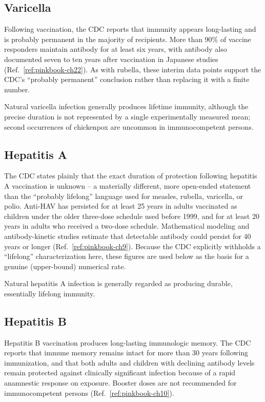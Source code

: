 \documentclass[11pt]{article}
\begin{document}
\subsection{Varicella}

Following vaccination, the CDC reports that immunity appears long-lasting
and is probably permanent in the majority of recipients. More than 90\% of
vaccine responders maintain antibody for at least six years, with antibody
also documented seven to ten years after vaccination in Japanese studies
(Ref.~\ref{ref:pinkbook-ch22}). As with rubella, these interim data points
support the CDC's ``probably permanent'' conclusion rather than replacing it
with a finite number.

Natural varicella infection generally produces lifetime immunity, although
the precise duration is not represented by a single experimentally measured
mean; second occurrences of chickenpox are uncommon in immunocompetent
persons.

\subsection{Hepatitis A}

The CDC states plainly that the exact duration of protection following
hepatitis A vaccination is unknown -- a materially different, more
open-ended statement than the ``probably lifelong'' language used for
measles, rubella, varicella, or polio. Anti-HAV has persisted for at least
25 years in adults vaccinated as children under the older three-dose
schedule used before 1999, and for at least 20 years in adults who received
a two-dose schedule. Mathematical modeling and antibody-kinetic studies
estimate that detectable antibody could persist for 40 years or longer
(Ref.~\ref{ref:pinkbook-ch9}). Because the CDC explicitly withholds a
``lifelong'' characterization here, these figures are used below as the
basis for a genuine (upper-bound) numerical rate.

Natural hepatitis A infection is generally regarded as producing durable,
essentially lifelong immunity.

\subsection{Hepatitis B}

Hepatitis B vaccination produces long-lasting immunologic memory. The CDC
reports that immune memory remains intact for more than 30 years following
immunization, and that both adults and children with declining antibody
levels remain protected against clinically significant infection because of
a rapid anamnestic response on exposure. Booster doses are not recommended
for immunocompetent persons (Ref.~\ref{ref:pinkbook-ch10}).
\end{document}
